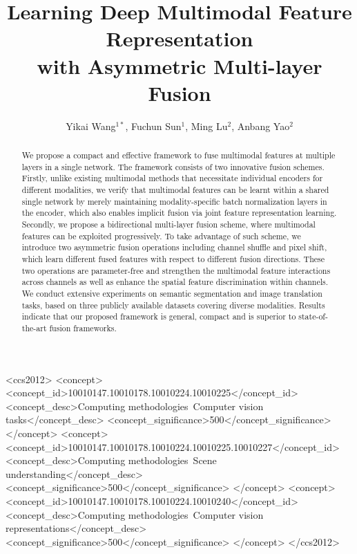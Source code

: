 \documentclass[sigconf]{acmart}
\begin{document}
\fancyhead{}

\title{Learning Deep Multimodal Feature Representation\\with Asymmetric Multi-layer Fusion}

\author{Yikai Wang$^{1*}$, Fuchun Sun$^1$, Ming Lu$^2$, Anbang Yao$^2$} 


\renewcommand{\shortauthors}{Y. Wang, F. Sun, M. Lu and A. Yao}



\begin{abstract}
We propose a compact and effective framework to fuse multimodal features at multiple layers in a single network. The framework consists of two innovative fusion schemes. Firstly, unlike existing multimodal methods that necessitate individual encoders for different modalities, we verify that multimodal features can be learnt within a shared single network by merely maintaining modality-specific batch normalization layers in the encoder, which also enables implicit fusion via joint feature representation learning. Secondly, we propose a bidirectional multi-layer fusion scheme, where multimodal features can be exploited progressively. To take advantage of such scheme, we introduce two asymmetric fusion operations including channel shuffle and pixel shift, which learn different fused features with respect to different fusion directions. These two operations are parameter-free and strengthen the multimodal feature interactions across channels as well as enhance the spatial feature discrimination within channels. We conduct extensive experiments on semantic segmentation and image translation tasks, based on three publicly available datasets covering diverse modalities. Results indicate that our proposed framework is general, compact and is superior to state-of-the-art fusion frameworks.
\end{abstract}

\begin{CCSXML}
<ccs2012>
   <concept>
       <concept_id>10010147.10010178.10010224.10010225</concept_id>
       <concept_desc>Computing methodologies~Computer vision tasks</concept_desc>
       <concept_significance>500</concept_significance>
       </concept>
   <concept>
       <concept_id>10010147.10010178.10010224.10010225.10010227</concept_id>
       <concept_desc>Computing methodologies~Scene understanding</concept_desc>
       <concept_significance>500</concept_significance>
       </concept>
   <concept>
       <concept_id>10010147.10010178.10010224.10010240</concept_id>
       <concept_desc>Computing methodologies~Computer vision representations</concept_desc>
       <concept_significance>500</concept_significance>
       </concept>
 </ccs2012>
\end{CCSXML}
\end{document}
